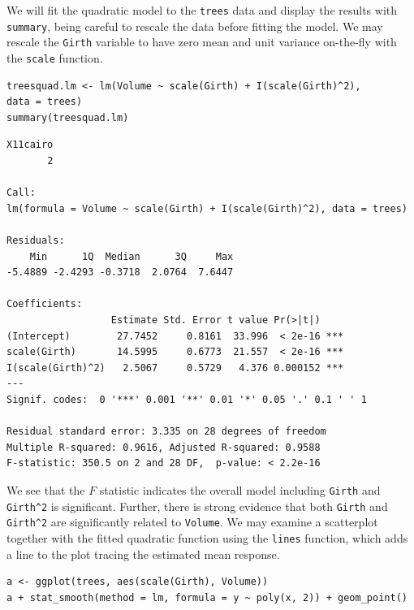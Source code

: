 \documentclass[captions=tableheading]{scrbook}
\begin{document}
\begin{example}
We will fit the quadratic model to the \texttt{trees} data and display the results with \texttt{summary}, being careful to rescale the data before fitting the model. We may rescale the \texttt{Girth} variable to have zero mean and unit variance on-the-fly with the \texttt{scale} function.


\begin{verbatim}
treesquad.lm <- lm(Volume ~ scale(Girth) + I(scale(Girth)^2),                    data = trees)
summary(treesquad.lm)
\end{verbatim}


\begin{verbatim}
X11cairo 
       2
 
Call:
lm(formula = Volume ~ scale(Girth) + I(scale(Girth)^2), data = trees)

Residuals:
    Min      1Q  Median      3Q     Max 
-5.4889 -2.4293 -0.3718  2.0764  7.6447 

Coefficients:
                  Estimate Std. Error t value Pr(>|t|)    
(Intercept)        27.7452     0.8161  33.996  < 2e-16 ***
scale(Girth)       14.5995     0.6773  21.557  < 2e-16 ***
I(scale(Girth)^2)   2.5067     0.5729   4.376 0.000152 ***
---
Signif. codes:  0 '***' 0.001 '**' 0.01 '*' 0.05 '.' 0.1 ' ' 1 

Residual standard error: 3.335 on 28 degrees of freedom
Multiple R-squared: 0.9616,	Adjusted R-squared: 0.9588 
F-statistic: 350.5 on 2 and 28 DF,  p-value: < 2.2e-16
\end{verbatim}

We see that the \(F\) statistic indicates the overall model including \texttt{Girth} and \texttt{Girth\textasciicircum{}2} is significant. Further, there is strong evidence that both \texttt{Girth} and \texttt{Girth\textasciicircum{}2} are significantly related to \texttt{Volume}. We may examine a scatterplot together with the fitted quadratic function using the \texttt{lines} function, which adds a line to the plot tracing the estimated mean response.


\begin{verbatim}
a <- ggplot(trees, aes(scale(Girth), Volume))
a + stat_smooth(method = lm, formula = y ~ poly(x, 2)) + geom_point()
\end{verbatim}






\end{example}
\end{document}
